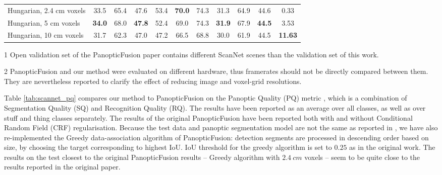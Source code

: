 \begin{table}[t]
\begin{center}
{\begin{threeparttable}
\begin{tabular}{c c c c | c c c | c c c | c}
\multicolumn{1}{l|}{Hungarian, 2.4 cm voxels}     & 33.5 & 65.4 & 47.6 & 53.4 & \textbf{70.0} & 74.3 & 31.3 & 64.9 & 44.6 & 0.33 \\
\multicolumn{1}{l|}{Hungarian,  5 cm voxels}       & \textbf{34.0} & 68.0 & \textbf{47.8} & 52.4 & 69.0 & 74.3 & \textbf{31.9} & 67.9 & \textbf{44.5} & 3.53 \\
\multicolumn{1}{l|}{Hungarian,  10 cm voxels}      & 31.7 & 62.3 & 47.0 & 47.2 & 66.5 & 68.8 & 30.0 & 61.9 & 44.5 & \textbf{11.63}\\
\end{tabular}
\begin{tablenotes}\footnotesize
\item[1] Open validation set of the PanopticFusion paper contains different ScanNet scenes than the validation set of this work.
\item[2] PanopticFusion and our method were evaluated on different hardware, thus framerates should not be directly compared between them. They are nevertheless reported to clarify the effect of reducing image and voxel-grid resolutions.
\end{tablenotes}
\end{threeparttable}}

\end{center}
\end{table}

Table \ref{tab:scannet_pq} compares our method to PanopticFusion on the Panoptic Quality (PQ) metric \cite{panoptic_segmentation}, which is a combination of Segmentation Quality (SQ) and Recognition Quality (RQ). The results have been reported as an average over all classes, as well as over stuff and thing classes separately. The results of the original PanopticFusion \cite{panopticfusion} have been reported both with and without Conditional Random Field (CRF) regularisation. Because the test data and panoptic segmentation model are not the same as reported in \cite{panopticfusion}, we have also re-implemented the Greedy data-association algorithm of PanopticFusion: detection segments are processed in descending order based on size, by choosing the target corresponding to highest IoU. IoU threshold for the greedy algorithm is set to $0.25$ as in the original work. The results on the test closest to the original PanopticFusion results -- Greedy algorithm with $2.4~cm$ voxels -- seem to be quite close to the results reported in the original paper.

